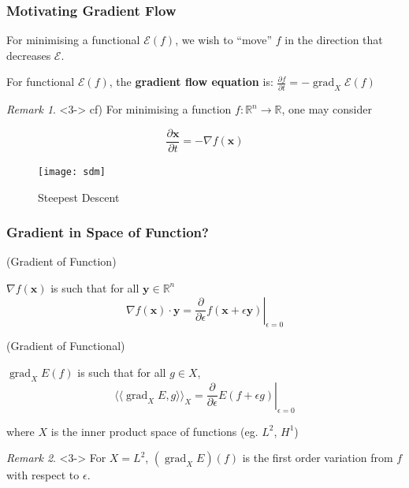 \documentclass{beamer}
\theoremstyle{remark}
\newtheorem{remark}{Remark}
\newcommand{\xbf}{\mathbf{x}}
\newcommand{\ybf}{\mathbf{y}}
\newcommand{\inner}[1]{\langle \langle #1 \rangle \rangle}
\DeclareMathOperator{\grad}{grad}
\begin{document}
\begin{frame}
    \frametitle{Motivating Gradient Flow}
    For minimising a functional $\mathcal{E}(f)$, we wish to ``move'' $f$ in the direction that decreases $\mathcal{E}$.
    {
        \begin{definition}
            For functional $\mathcal{E} (f)$, the \textbf{gradient flow equation} is:
            $\frac{\partial f}{\partial t} = - \grad_X \mathcal{E} \left( f \right)$
        \end{definition}
    }
    \begin{remark}<3->
    cf) For minimising a function $f:\mathbb{R}^n \rightarrow \mathbb{R}$, one may consider
    \begin{multicols}{2}
        \begin{equation*}
            \frac{\partial \xbf}{\partial t} = - \nabla f \left( \xbf \right)
        \end{equation*}
        \columnbreak
        \begin{figure}[h]
            \centering
            \texttt{[image: sdm]}
            \caption{Steepest Descent}
        \end{figure}
    \end{multicols}
    \end{remark}
\end{frame}

\begin{frame}
    \frametitle{Gradient in Space of Function?}

    \begin{multicols}{2}
        {
            (Gradient of Function)

            $\nabla f\left( \xbf \right)$ is such that
            for all $\ybf \in \mathbb{R}^n$
            \begin{equation*}
                \left.\nabla f \left( \xbf \right) \cdot \ybf = \frac{\partial}{\partial \epsilon} f \left( \xbf + \epsilon \ybf \right)\right|_{\epsilon = 0}
                \end{equation*}
            }
        \columnbreak

        {
            (Gradient of Functional)

            $\grad_X E \left( f \right)$ is such that
            for all $g \in X$,
            \begin{equation*}
                \left.\inner{\grad_X E, g}_X = \frac{\partial}{\partial \epsilon} E \left( f + \epsilon g \right)\right|_{\epsilon = 0}
                \end{equation*}
            }
    \end{multicols}
    {
        where $X$ is the inner product space of functions (eg. $L^2$, $H^1$)
    }
    \begin{remark}<3->
        For $X=L^2$, $\left( \grad_X E\right) (f)$ is the first order variation from $f$ with respect to $\epsilon$.
    \end{remark}
\end{frame}
\end{document}

